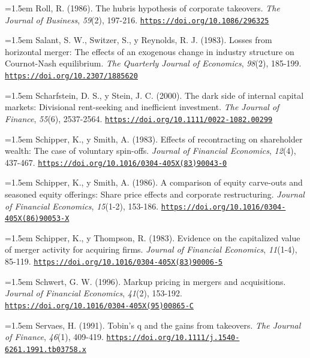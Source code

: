 \documentclass[10pt,a4paper]{article}
\begin{document}
\noindent\hangindent=1.5em Roll, R. (1986). The hubris hypothesis of corporate takeovers. \textit{The Journal of Business}, \textit{59}(2), 197-216. \href{https://doi.org/10.1086/296325}{\nolinkurl{https://doi.org/10.1086/296325}}

\noindent\hangindent=1.5em Salant, S. W., Switzer, S., y Reynolds, R. J. (1983). Losses from horizontal merger: The effects of an exogenous change in industry structure on Cournot-Nash equilibrium. \textit{The Quarterly Journal of Economics}, \textit{98}(2), 185-199. \href{https://doi.org/10.2307/1885620}{\nolinkurl{https://doi.org/10.2307/1885620}}

\noindent\hangindent=1.5em Scharfstein, D. S., y Stein, J. C. (2000). The dark side of internal capital markets: Divisional rent-seeking and inefficient investment. \textit{The Journal of Finance}, \textit{55}(6), 2537-2564. \href{https://doi.org/10.1111/0022-1082.00299}{\nolinkurl{https://doi.org/10.1111/0022-1082.00299}}

\noindent\hangindent=1.5em Schipper, K., y Smith, A. (1983). Effects of recontracting on shareholder wealth: The case of voluntary spin-offs. \textit{Journal of Financial Economics}, \textit{12}(4), 437-467. \href{https://doi.org/10.1016/0304-405X(83)90043-0}{\nolinkurl{https://doi.org/10.1016/0304-405X(83)90043-0}}

\noindent\hangindent=1.5em Schipper, K., y Smith, A. (1986). A comparison of equity carve-outs and seasoned equity offerings: Share price effects and corporate restructuring. \textit{Journal of Financial Economics}, \textit{15}(1-2), 153-186. \href{https://doi.org/10.1016/0304-405X(86)90053-X}{\nolinkurl{https://doi.org/10.1016/0304-405X(86)90053-X}}

\noindent\hangindent=1.5em Schipper, K., y Thompson, R. (1983). Evidence on the capitalized value of merger activity for acquiring firms. \textit{Journal of Financial Economics}, \textit{11}(1-4), 85-119. \href{https://doi.org/10.1016/0304-405X(83)90006-5}{\nolinkurl{https://doi.org/10.1016/0304-405X(83)90006-5}}

\noindent\hangindent=1.5em Schwert, G. W. (1996). Markup pricing in mergers and acquisitions. \textit{Journal of Financial Economics}, \textit{41}(2), 153-192. \href{https://doi.org/10.1016/0304-405X(95)00865-C}{\nolinkurl{https://doi.org/10.1016/0304-405X(95)00865-C}}

\noindent\hangindent=1.5em Servaes, H. (1991). Tobin's q and the gains from takeovers. \textit{The Journal of Finance}, \textit{46}(1), 409-419. \href{https://doi.org/10.1111/j.1540-6261.1991.tb03758.x}{\nolinkurl{https://doi.org/10.1111/j.1540-6261.1991.tb03758.x}}
\end{document}
